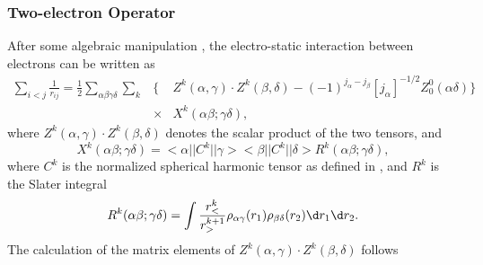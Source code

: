 \documentclass{elsart}
\begin{document}
\subsubsection{Two-electron Operator}
After some algebraic manipulation \citep{barshalom88}, the
electro-static interaction between electrons can be written as 
\begin{eqnarray}
\label{eq_2e}
\sum_{i<j} \frac{1}{r_{ij}} = \frac{1}{2}
\sum_{\alpha\beta\gamma\delta}
\sum_{k} &\Bigg\{& Z^k(\alpha,\gamma)\cdot Z^k(\beta,\delta)
-(-1)^{j_\alpha-j_\beta}[j_\alpha]^{-1/2}Z^0_0(\alpha\delta)\Bigg\}\nonumber\\
&\times&X^k(\alpha\beta;\gamma\delta),
\end{eqnarray}
where $Z^k(\alpha,\gamma)\cdot Z^k(\beta,\delta)$ denotes the scalar product
of the two tensors, and 
\begin{equation}
X^k(\alpha\beta;\gamma\delta) = <\alpha||C^k||\gamma><\beta||C^k||\delta>
R^k(\alpha\beta;\gamma\delta),
\end{equation}
where $C^k$ is the normalized spherical harmonic tensor as defined in
\citet{cowan81}, and $R^k$ is the Slater integral
\begin{equation}
R^k(\alpha\beta;\gamma\delta) = \int \frac{r_<^k}{r_>^{k+1}}
\rho_{\alpha\gamma}(r_1)\rho_{\beta\delta}(r_2)\d r_1 \d r_2.
\end{equation}
The calculation of the 
matrix elements of $Z^k(\alpha,\gamma)\cdot Z^k(\beta,\delta)$ follows
\citet{gaigalas97} 
\end{document}
